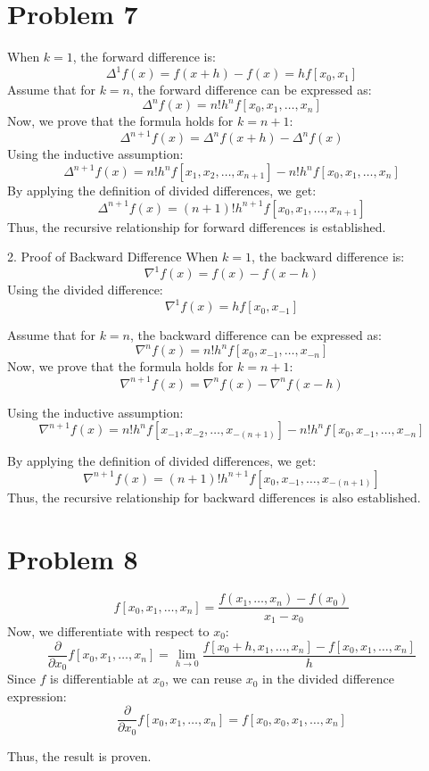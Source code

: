 \documentclass{article}
\begin{document}
\section*{Problem 7}  
When \( k = 1 \), the forward difference is:
\[\Delta^1 f(x) = f(x+h) - f(x) = h f[x_0, x_1]\]
Assume that for \( k = n \), the forward difference can be expressed as:
\[\Delta^n f(x) = n! h^n f[x_0, x_1, \dots, x_n]\]
Now, we prove that the formula holds for \( k = n+1 \):
   \[\Delta^{n+1} f(x) = \Delta^n f(x+h) - \Delta^n f(x)\]
   Using the inductive assumption:
   \[\Delta^{n+1} f(x) = n! h^n f[x_1, x_2, \dots, x_{n+1}] - n! h^n f[x_0, x_1, \dots, x_n]\]
   By applying the definition of divided differences, we get:
   \[\Delta^{n+1} f(x) = (n+1)! h^{n+1} f[x_0, x_1, \dots, x_{n+1}]\]
Thus, the recursive relationship for forward differences is established.

2. Proof of Backward Difference  
   When \( k = 1 \), the backward difference is:
   \[\nabla^1 f(x) = f(x) - f(x-h)\]
   Using the divided difference:
   \[\nabla^1 f(x) = h f[x_0, x_{-1}]\]

   Assume that for \( k = n \), the backward difference can be expressed as:
\[\nabla^n f(x) = n! h^n f[x_0, x_{-1}, \dots, x_{-n}]\]
   Now, we prove that the formula holds for \( k = n+1 \):
   \[\nabla^{n+1} f(x) = \nabla^n f(x) - \nabla^n f(x-h)\]

   Using the inductive assumption:
   \[\nabla^{n+1} f(x) = n! h^n f[x_{-1}, x_{-2}, \dots, x_{-(n+1)}] - n! h^n f[x_0, x_{-1}, \dots, x_{-n}]\]

   By applying the definition of divided differences, we get:
   \[\nabla^{n+1} f(x) = (n+1)! h^{n+1} f[x_0, x_{-1}, \dots, x_{-(n+1)}]\]
Thus, the recursive relationship for backward differences is also established.


\section*{Problem 8}
\[f[x_0, x_1, \dots, x_n] = \frac{f(x_1, \dots, x_n) - f(x_0)}{x_1 - x_0}\]
Now, we differentiate with respect to \( x_0 \):
\[\frac{\partial}{\partial x_0} f[x_0, x_1, \dots, x_n] = \lim_{h \to 0} \frac{f[x_0 + h, x_1, \dots, x_n] - f[x_0, x_1, \dots, x_n]}{h}\]
Since \( f \) is differentiable at \( x_0 \), we can reuse \( x_0 \) in the divided difference expression:
\[\frac{\partial}{\partial x_0} f[x_0, x_1, \dots, x_n] = f[x_0, x_0, x_1, \dots, x_n]\]

Thus, the result is proven.
\end{document}
